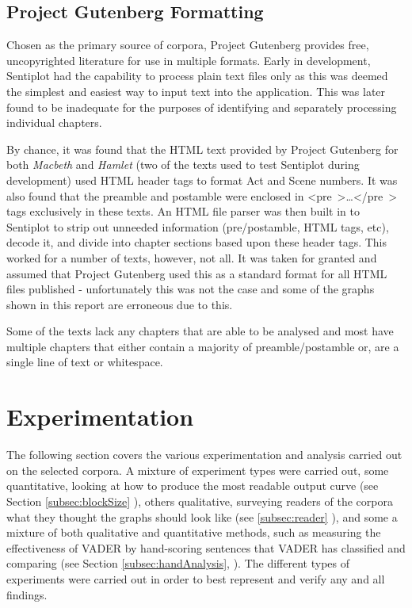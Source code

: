 \documentclass{article}
\begin{document}
{    \subsection{Project Gutenberg Formatting}
    \label{subsec:gutenbergFormat}
            Chosen as the primary source of corpora, Project Gutenberg provides free, uncopyrighted literature for use in multiple formats. Early in development, Sentiplot had the capability to process plain text files only as this was deemed the simplest and easiest way to input text into the application. This was later found to be inadequate for the purposes of identifying and separately processing individual chapters.

            By chance, it was found that the HTML text provided by Project Gutenberg for both \textit{Macbeth} and \textit{Hamlet} (two of the texts used to test Sentiplot during development) used HTML header tags to format Act and Scene numbers. It was also found that the preamble and postamble were enclosed in \mbox{\textless pre \textgreater \dots \textless /pre \textgreater} tags exclusively in these texts. An HTML file parser was then built in to Sentiplot to strip out unneeded information (pre/postamble, HTML tags, etc), decode it, and divide into chapter sections based upon these header tags. This worked for a number of texts, however, not all. It was taken for granted and assumed that Project Gutenberg used this as a standard format for all HTML files published - unfortunately this was not the case and some of the graphs shown in this report are erroneous due to this.
            
            Some of the texts lack any chapters that are able to be analysed and most have multiple chapters that either contain a majority of preamble/postamble or, are a single line of text or whitespace.
\newpage
\section{Experimentation}
\label{sec:experiments}
The following section covers the various experimentation and analysis carried out on the selected corpora. A mixture of experiment types were carried out, some quantitative, looking at how to produce the most readable output curve (see Section \ref{subsec:blockSize} ), others qualitative, surveying readers of the corpora what they thought the graphs should look like (see \ref{subsec:reader} ), and some a mixture of both qualitative and quantitative methods, such as measuring the effectiveness of VADER by hand-scoring sentences that VADER has classified and comparing (see Section \ref{subsec:handAnalysis}, ). The different types of experiments were carried out in order to best represent and verify any and all findings.

}
\end{document}
